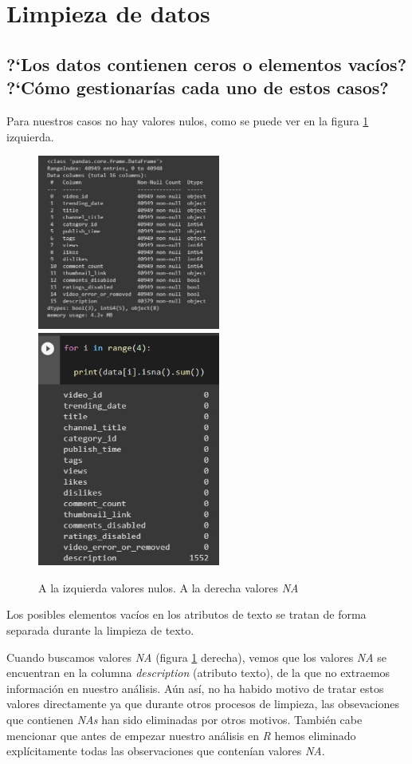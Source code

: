 \documentclass[a4paper,12pt]{article}
\begin{document}
\section[item_limpieza]{Limpieza de datos}

\subsection{?`Los datos contienen ceros o elementos vac\'ios? ?`C\'omo gestionar\'ias cada uno de estos casos?}

Para nuestros casos no hay valores nulos, como se puede ver en la figura \ref{fig:nula} izquierda.

\begin{figure}[h!]
\centering
\includegraphics[width=6cm]{vacio_datos.JPG}
\includegraphics[width=6cm]{Na_values.JPG}
\caption{A la izquierda valores nulos. A la derecha valores {\itshape NA}}
\label{fig:nula}
\end{figure}

Los posibles elementos vac\'ios en los atributos de texto se tratan de forma separada durante la limpieza de texto.

Cuando buscamos valores {\itshape NA} (figura \ref{fig:nula} derecha), vemos que los valores {\itshape NA} se encuentran en la columna {\itshape description} (atributo texto), de la que no extraemos informaci\'on en nuestro an\'alisis. A\'un as\'i, no ha habido motivo de tratar estos valores directamente ya que durante otros procesos de limpieza, las obsevaciones  que contienen {\itshape NAs} han sido eliminadas por otros motivos. Tambi\'en cabe mencionar que antes de empezar nuestro an\'alisis en {\itshape R} hemos eliminado expl\'icitamente todas las observaciones que conten\'ian valores {\itshape NA}.
\end{document}
